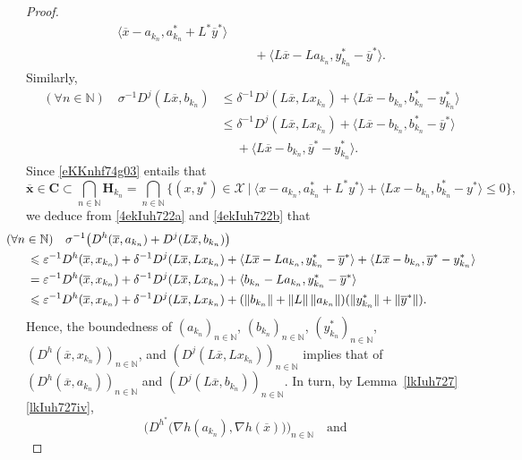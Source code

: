 \documentclass[a4paper,11pt,fleqn]{article}
\renewcommand{\leq}{\ensuremath{\leqslant}}
\newcommand{\pair}[2]{\langle{{#1},{#2}}\rangle}
\newcommand{\menge}[2]{\big\{{#1}~\big |~{#2}\big\}}
\newcommand{\XXX}{\ensuremath{\boldsymbol{\mathcal X}}}
\newcommand{\NN}{\ensuremath{\mathbb N}}
\theoremstyle{plain}{\theorembodyfont{\rmfamily}%
\newtheorem{conjecture}[theorem]{Conjecture}}
\theoremstyle{plain}{\theorembodyfont{\rmfamily}%
\newtheorem{example}[theorem]{Example}}
\theoremstyle{plain}{\theorembodyfont{\rmfamily}%
\newtheorem{remark}[theorem]{Remark}}
\theoremstyle{plain}{\theorembodyfont{\rmfamily}%
\newtheorem{algorithm}[theorem]{Algorithm}}
\theoremstyle{plain}{\theorembodyfont{\rmfamily}%
\newtheorem{condition}[theorem]{Condition}}
\theoremstyle{plain}{\theorembodyfont{\rmfamily}%
\newtheorem{definition}[theorem]{Definition}}
\theoremstyle{plain}{\theorembodyfont{\rmfamily}
\newtheorem{problem}[theorem]{Problem}}
\theoremstyle{plain}{\theorembodyfont{\rmfamily}
\newtheorem{notation}[theorem]{Notation}}
\numberwithin{equation}{section}
\begin{document}
\begin{proof}
\begin{align}
\pair{\overline{x}-a_{k_n}}{a^*_{k_n}+L^*\overline{y}^*}
\nonumber\\
&\quad\;+\pair{L\overline{x}-La_{k_n}}{y^*_{k_n}-\overline{y}^*}.
\end{align}
Similarly,
\begin{align}
\label{4ekIuh722b}
(\forall n\in\NN)\quad 
\sigma^{-1}D^j(L\overline{x},b_{k_n})
&\leq\delta^{-1}D^j(L\overline{x},Lx_{k_n})
+\pair{L\overline{x}-b_{k_n}}{b_{k_n}^*-y_{k_n}^*}\nonumber\\
&\leq\delta^{-1}D^j(L\overline{x},Lx_{k_n})
+\pair{L\overline{x}-b_{k_n}}{b_{k_n}^*-\overline{y}^*}
\nonumber\\
&\quad\;+\pair{L\overline{x}-b_{k_n}}{\overline{y}^*-y_{k_n}^*}.
\end{align}
Since \eqref{eKKnhf74g03} entails that
\begin{equation}
\label{ekIuh725a}
\overline{\boldsymbol{x}}\in\boldsymbol{C}\subset
\bigcap_{n\in\NN}\boldsymbol{H}_{k_n}=
\bigcap_{n\in\NN}\menge{(x,y^*)\in\XXX}
{\pair{x-a_{k_n}}{a_{k_n}^*+L^*y^*}+
\pair{Lx-b_{k_n}}{b_{k_n}^*-y^*}\leq 0},
\end{equation}
we deduce from \eqref{4ekIuh722a} and 
\eqref{4ekIuh722b} that
\begin{align}
&\hskip -6mm (\forall n\in\NN)\quad
\sigma^{-1}\big(D^h(\overline{x},a_{k_n})
+D^j(L\overline{x},b_{k_n})\big)\nonumber\\
&\leq\varepsilon^{-1}D^h(\overline{x},x_{k_n})
+\delta^{-1}D^j(L\overline{x},Lx_{k_n})
+\pair{L\overline{x}-La_{k_n}}{y^*_{k_n}-\overline{y}^*}
+\pair{L\overline{x}-b_{k_n}}{\overline{y}^*-y_{k_n}^*}
\nonumber\\
&=\varepsilon^{-1}D^h(\overline{x},x_{k_n})
+\delta^{-1}D^j(L\overline{x},Lx_{k_n})
+\pair{b_{k_n}-La_{k_n}}{y^*_{k_n}-\overline{y}^*}
\nonumber\\
&\leq\varepsilon^{-1}D^h(\overline{x},x_{k_n})
+\delta^{-1}D^j(L\overline{x},Lx_{k_n})
+(\|b_{k_n}\|+\|L\|\,\|a_{k_n}\|)(\|y^*_{k_n}\|+\|\overline{y}^*\|).
\end{align}
Hence, the boundedness of $(a_{k_n})_{n\in\NN}$, 
$(b_{k_n})_{n\in\NN}$, $(y^*_{k_n})_{n\in\NN}$, 
$(D^h(\overline{x},x_{k_n}))_{n\in\NN}$, 
and $(D^j(L\overline{x},Lx_{k_n}))_{n\in\NN}$ implies that of
$(D^h(\overline{x},a_{k_n}))_{n\in\NN}$ and 
$(D^j(L\overline{x},b_{k_n}))_{n\in\NN}$.
In turn, by Lemma~\ref{lkIuh727}\ref{lkIuh727iv},
\begin{equation}
\label{4ekIuh722c}
\Big(D^{h^*}\big(\nabla h(a_{k_n}),
\nabla h(\overline{x})\big)\Big)_{n\in\NN}
\quad\text{and}\quad

\end{equation}
\end{proof}
\end{document}

